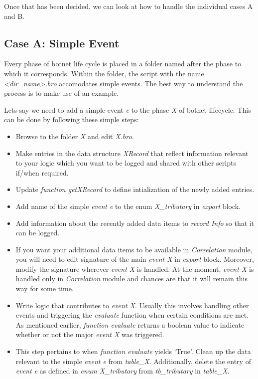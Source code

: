 \documentclass[acmtocl]{acmtrans2m}
\begin{document}
Once that has been decided, we can look at how to handle 
the individual cases A and B.

\subsection{Case A: Simple Event}
Every phase of botnet life cycle is placed in a folder
named after the phase to which it corresponds. Within the
folder, the script with the name \textit{<dir\_name>.bro} 
accomodates simple events. The best way to understand the
process is to make use of an example.

Lets say we need to add a simple event \textit{e} to the phase
\textit{X} of botnet lifecycle. This can be done by following these
simple steps:
\begin{itemize}
\item Browse to the folder \textit{X} and edit \textit{X.bro}.
\item Make entries in the data structure \textit{XRecord}
that reflect information relevant to your logic which
you want to be logged and shared with other scripts if/when
required.
\item Update \textit{function getXRecord} to define intialization
of the newly added entries.
\item Add name of the simple \textit{event e} to the enum \textit{X\_tributary}
in \textit{export} block.
\item Add information about the recently added data items to
\textit{record Info} so that it can be logged.
\item If you want your additional data items to be available
in \textit{Correlation} module, you will need to edit signature of the 
main \textit{event X} in \textit{export} block. Moreover, modify the 
signature wherever \textit{event X} is handled. At the moment,
\textit{event X} is handled only in \textit{Correlation} module
and chances are that it will remain this way for some time.
  
\item Write logic that contributes to \textit{event X}.
Usually this involves handling other events and triggering
the \textit{evaluate} function when certain conditions are met.
As mentioned earlier, \textit{function evaluate} returns a
boolean value to indicate whether or not the major
\textit{event X} was triggered. 
\item This step pertains to when \textit{function evaluate}
yields `True'. Clean up the data relevant to the simple 
\textit{event e} from \textit{table\_X}. Additionally, delete the entry of 
\textit{event e} as defined in \textit{enum X\_tributary} from 
\textit{tb\_tributary} in \textit{table\_X}.  
\end{itemize}
\end{document}
